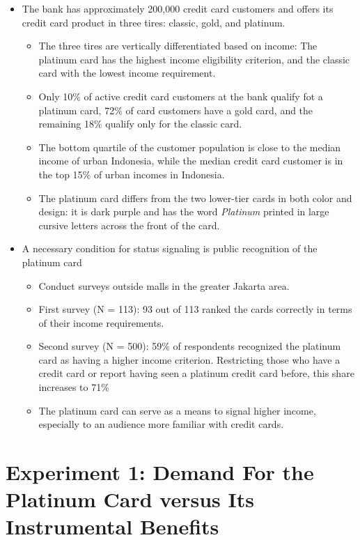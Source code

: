 \documentclass[../root]{subfiles}
\begin{document}
    \begin{itemize}
        \item The bank has approximately 200,000 credit card customers and offers its credit card product in three tires: classic, gold, and platinum.
        \begin{itemize}
            \item The three tires are vertically differentiated based on income: The platinum card has the highest income eligibility criterion, and the classic card with the lowest income requirement.
            \item Only 10\% of active credit card customers at the bank qualify fot a platinum card, 72\% of card customers have a gold card, and the remaining 18\% qualify only for the classic card.
            \item The bottom quartile of the customer population is close to the median income of urban Indonesia, while the median credit card customer is in the top 15\% of urban incomes in Indonesia.
            \item The platinum card differs from the two lower-tier cards in both color and design: it is dark purple and has the word \textit{Platinum} printed in large cursive letters across the front of the card.
        \end{itemize}
        \item A necessary condition for status signaling is public recognition of the platinum card
        \begin{itemize}
            \item Conduct surveys outside malls in the greater Jakarta area.
            \item First survey (N = 113): 93 out of 113 ranked the cards correctly in terms of their income requirements.
            \item Second survey (N = 500): 59\% of respondents recognized the platinum card as having a higher income criterion. Restricting those who have a credit card or report having seen a platinum credit card before, this share increases to 71\%
            \item The platinum card can serve as a means to signal higher income, especially to an audience more familiar with credit cards.
        \end{itemize}
    \end{itemize}

    \section{Experiment 1: Demand For the Platinum Card versus Its Instrumental Benefits}
\end{document}
